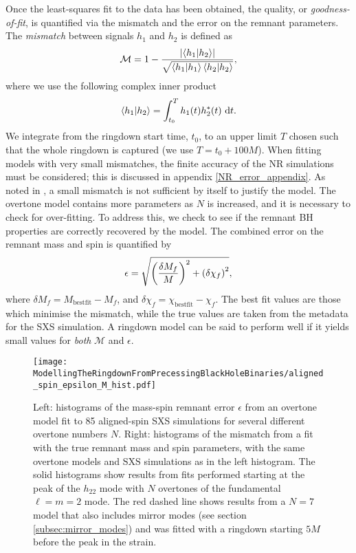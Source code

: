 Once the least-squares fit to the data has been obtained, the quality, or \emph{goodness-of-fit}, is quantified via the mismatch and the error on the remnant parameters.
The \emph{mismatch} between signals $h_1$ and $h_2$ is defined as
\begin{equation}\label{mismatch}
    \mathcal{M} = 1 - \frac{\abs{ \braket{h_1}{h_2} }}{\sqrt{\braket{h_1}\braket{h_2}}},
\end{equation}
where we use the following complex inner product \cite{Nollert:1998ys}
\begin{equation} \label{eq:inner_prod}
    \braket{h_1}{h_2} = \int_{t_0}^T h_1(t) h^*_2(t) ~ \dd t.
\end{equation}
We integrate from the ringdown start time, $t_0$, to an upper limit $T$ chosen such that the whole ringdown is captured (we use $T = t_0 + 100M$).
When fitting models with very small mismatches, the finite accuracy of the NR simulations must be considered; this is discussed in appendix \ref{NR_error_appendix}.
As noted in \cite{Giesler:2019uxc}, a small mismatch is not sufficient by itself to justify the model.
The overtone model contains more parameters as $N$ is increased, and it is necessary to check for over-fitting.
To address this, we check to see if the remnant BH properties are correctly recovered by the model. 
The combined error on the remnant mass and spin is quantified by \cite{Giesler:2019uxc}
\begin{equation} \label{eq:epsilon}
    \epsilon = \sqrt{ \qty( \frac{\delta M_f}{M} )^2 + \qty( \delta\chi_f )^2 },
\end{equation}
where $\delta M_f = M_{\mathrm{best fit}} - M_f$, and $\delta \chi_f = \chi_{\mathrm{best fit}} - \chi_f$. 
The best fit values are those which minimise the mismatch, while the true values are taken from the metadata for the SXS simulation.
A ringdown model can be said to perform well if it yields small values for \emph{both} $\mathcal{M}$ and $\epsilon$.

\begin{figure*}[t]
    \centering
    \texttt{[image: ModellingTheRingdownFromPrecessingBlackHoleBinaries/aligned\_spin\_epsilon\_M\_hist.pdf]}
    \caption[Remnant error and mismatches for fits to aligned-spin SXS simulations using an overtone model]{Left: histograms of the mass-spin remnant error $\epsilon$ from an overtone model fit to 85 aligned-spin SXS simulations for several different overtone numbers $N$. 
    Right: histograms of the mismatch from a fit with the true remnant mass and spin parameters, with the same overtone models and SXS simulations as in the left histogram.
    The solid histograms show results from fits performed starting at the peak of the $h_{22}$ mode with $N$ overtones of the fundamental $\ell = m = 2$ mode.
    The red dashed line shows results from a $N=7$ model that also includes mirror modes (see section \ref{subsec:mirror_modes}) and was fitted with a ringdown starting $5M$ before the peak in the strain.}
    \label{aligned_spin_epsilon_hist}
\end{figure*}

